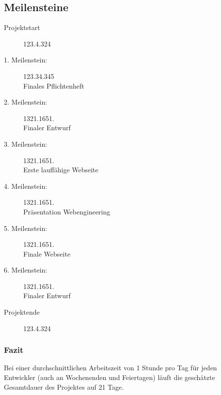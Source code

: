 \newpage
\subsection{Meilensteine}
\begin{description}
	\item[Projektstart] 123.4.324
	\item[1. Meilenstein:] 123.34.345\\
	Finales Pflichtenheft
	\item[2. Meilenstein:] 1321.1651.\\
	Finaler Entwurf
	\item[3. Meilenstein:] 1321.1651.\\
	Erste lauffähige Webseite
	\item[4. Meilenstein:] 1321.1651.\\
	Präsentation Webengineering
	\item[5. Meilenstein:] 1321.1651.\\
	Finale Webseite
	\item[6. Meilenstein:] 1321.1651.\\
	Finaler Entwurf
	\item[Projektende] 123.4.324
\end{description}

\subsubsection{Fazit}
Bei einer durchschnittlichen Arbeitszeit von 1 Stunde pro Tag für jeden Entwickler (auch an Wochenenden und Feiertagen) läuft die geschätzte Gesamtdauer des Projektes auf 21 Tage.
